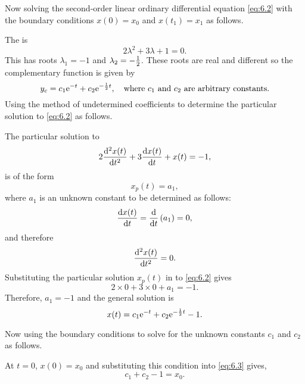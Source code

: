 Now solving the second-order linear ordinary differential equation \eqref{eq:6.2} with the boundary conditions $x(0) = x_0$ and $x(t_1) = x_1$ as follows.

The \auxe is
\[
	2\lambda^2 + 3\lambda + 1 = 0.
\] 
This has roots $\lambda_1=-1$ and $\lambda_2=-\frac{1}{2}$. These roots are real and different so the complementary function is given by
\[
	y_c = c_1\mathrm{e}^{-t} + c_2\mathrm{e}^{-\frac{1}{2} t},\quad\textrm{where } c_1 \textrm{ and } c_2 \textrm{ are arbitrary constants.}
\]
Using the method of undetermined coefficients to determine the particular solution to \eqref{eq:6.2} as follows.

The particular solution to
\[
	2\frac{\mathrm{d}^2x(t)}{\mathrm{d}t^2} + 3 \frac{\mathrm{d}x(t)}{\mathrm{d}t} +x(t) = -1,
\]
is of the form
\[
	x_p(t) = a_1,
\]
where $a_1$ is an unknown constant to be determined as follows:
\[
	\frac{\mathrm{d}x(t)}{\mathrm{d}t} = \frac{\mathrm{d}}{\mathrm{d}t}\left(a_1\right) = 0,
\]
and therefore
\[
	\frac{\mathrm{d}^2x(t)}{\mathrm{d}t^2} = 0.
\]
Substituting the particular solution $x_p(t)$ in to \eqref{eq:6.2} gives
\[
	2\times0 + 3\times0 + a_1 = -1.
\]
Therefore, $a_1 = -1$ and the general solution is
\begin{equation}
	\label{eq:6.3}
	x(t) = c_1\mathrm{e}^{-t} + c_2\mathrm{e}^{-\frac{1}{2} t} - 1.
\end{equation}

Now using the boundary conditions to solve for the unknown constants $c_1$ and $c_2$ as follows.

At $t=0$, $x(0) = x_0$ and substituting this condition into \eqref{eq:6.3} gives,
\begin{equation}
	\label{eq:6.4}
	c_1 + c_2 - 1 = x_0.
\end{equation}

